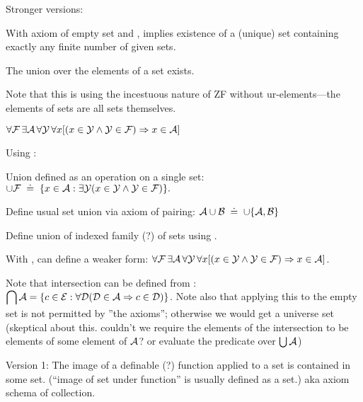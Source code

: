 Stronger versions:

With axiom of empty set\cite{wiki:AxiomOfEmptySet} 
and ,
implies existence of a (unique) set containing exactly
any finite number of given sets.

\label{sec:Axiom-of-union}

The union over the elements of a set 
exists\cite{wiki:AxiomOfUnion}.

Note that this is using the incestuous nature of 
\textsf{ZF} without ur-elements---the elements of sets
are all sets themselves. 
 
$\forall {\ensuremath{\mathcal{F}}}\,
\exists \mathcal{A}\,
\forall \mathcal{Y}\,\forall x
[(x\in \mathcal{Y} \land \mathcal{Y}\in \mathcal{F})
\Rightarrow x\in \mathcal{A}]$

Using :

Union defined as an operation on a single set:\hfill\break
${\displaystyle 
\cup {\ensuremath{\mathcal{F}}} \; \doteq \;
\{x\in \mathcal{A}:\exists \mathcal{Y} 
(x \in \mathcal{Y} \land \mathcal{Y} \in \mathcal{F})\}.}$

Define usual set union via axiom of pairing:
$\mathcal{A} \cup \mathcal{B} \; \doteq \; \cup \{ \mathcal{A}, \mathcal{B}\}$

Define union of indexed family (?) of sets
using .

With ,
can define a weaker form:
$\forall {\ensuremath{\mathcal{F}}}\,\exists \mathcal{A}\,\forall \mathcal{Y}\,
\forall x
[(x\in \mathcal{Y} 
\land 
\mathcal{Y}\in {\ensuremath{\mathcal{F}}})
\Rightarrow 
x\in \mathcal{A}]$.

Note that intersection can be defined from 
:\hfill\linebreak
${\displaystyle 
\bigcap \mathcal{A}=\{c\in \mathcal{E}:
\forall \mathcal{D} (\mathcal{D} \in \mathcal{A} \Rightarrow c\in \mathcal{D})\}}$.
Note also that applying this to the empty set
is not permitted by ''the axioms'';
otherwise we would get a universe set 
(skeptical about this.
couldn't we require the elements of the intersection
to be elements of some element of $\mathcal{A}$?
or evaluate the predicate over $\bigcup \mathcal{A}$)

\label{sec:Axiom-schema-of-replacement}

Version 1: 
The image of a definable (?) function applied to a set
is contained in some set.\cite{wiki:AxiomSchemaOfReplacement}
(``image of set under function'' is usually defined as a set.)
aka axiom schema of collection.

